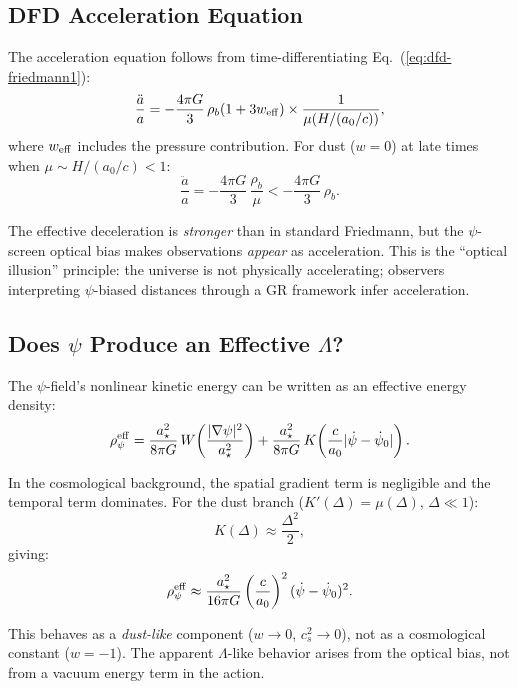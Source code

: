 \documentclass[aps,prd,twocolumn,superscriptaddress,nofootinbib]{revtex4-2}
\begin{document}
\subsection{DFD Acceleration Equation}

The acceleration equation follows from time-differentiating
Eq.~(\ref{eq:dfd-friedmann1}):
\begin{equation}\label{eq:dfd-acceleration}
\frac{\ddot{a}}{a} = -\frac{4\pi G}{3}\,\rho_b(1 + 3w_{\rm eff})
\times\frac{1}{\mu(H/(a_0/c))},
\end{equation}
where $w_{\rm eff}$ includes the pressure contribution. For
dust ($w = 0$) at late times when $\mu \sim H/(a_0/c) < 1$:
\begin{equation}
\frac{\ddot{a}}{a} = -\frac{4\pi G}{3}\,\frac{\rho_b}{\mu}
< -\frac{4\pi G}{3}\,\rho_b.
\end{equation}

The effective deceleration is \textit{stronger} than in standard
Friedmann, but the $\psi$-screen optical bias makes observations
\textit{appear} as acceleration. This is the ``optical illusion''
principle: the universe is not physically accelerating; observers
interpreting $\psi$-biased distances through a GR framework
infer acceleration.

\subsection{Does $\psi$ Produce an Effective $\Lambda$?}

The $\psi$-field's nonlinear kinetic energy can be written as an
effective energy density:
\begin{equation}
\rho_\psi^{\rm eff} = \frac{a_\star^2}{8\pi G}\,
W\!\left(\frac{|\nabla\psi|^2}{a_\star^2}\right)
+ \frac{a_\star^2}{8\pi G}\,
K\!\left(\frac{c}{a_0}|\dot\psi-\dot\psi_0|\right).
\end{equation}

In the cosmological background, the spatial gradient term
is negligible and the temporal term dominates. For the dust
branch ($K'(\Delta) = \mu(\Delta)$, $\Delta \ll 1$):
\begin{equation}
K(\Delta) \approx \frac{\Delta^2}{2},
\end{equation}
giving:
\begin{equation}
\rho_\psi^{\rm eff} \approx
\frac{a_\star^2}{16\pi G}\left(\frac{c}{a_0}\right)^2
(\dot\psi - \dot\psi_0)^2.
\end{equation}

This behaves as a \textit{dust-like} component ($w \to 0$,
$c_s^2 \to 0$), not as a cosmological constant ($w = -1$).
The apparent $\Lambda$-like behavior arises from the optical
bias, not from a vacuum energy term in the action.
\end{document}
